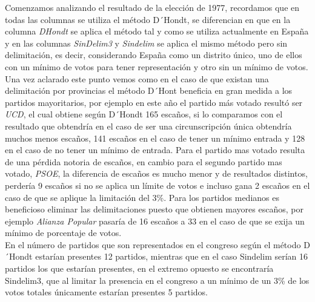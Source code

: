 \documentclass[12pt,a4paper,]{book}
\numberwithin{dummy}{section}
\theoremstyle{ocrenumbox}
\theoremstyle{blacknumex}
\theoremstyle{blacknumbox}
\theoremstyle{ocrenum}
\theoremstyle{ocrenum}
\begin{document}
Comenzamos analizando el resultado de la elección de 1977, recordamos
que en todas las columnas se utiliza el método D´Hondt, se diferencian
en que en la columna \emph{DHondt} se aplica el método tal y como se
utiliza actualmente en España y en las columnas \emph{SinDelim3} y
\emph{Sindelim} se aplica el mismo método pero sin delimitación, es
decir, considerando España como un distrito único, uno de ellos con un
mínimo de votos para tener representación y otro sin un mínimo de
votos.\\
Una vez aclarado este punto vemos como en el caso de que existan una
delimitación por provincias el método D´Hont beneficia en gran medida a
los partidos mayoritarios, por ejemplo en este año el partido más votado
resultó ser \emph{UCD}, el cual obtiene según D´Hondt 165 escaños, si lo
comparamos con el resultado que obtendría en el caso de ser una
circunscripción única obtendría muchos menos escaños, 141 escaños en el
caso de tener un mínimo entrada y 128 en el caso de no tener un mínimo
de entrada. Para el partido mas votado resulta de una pérdida notoria de
escaños, en cambio para el segundo partido mas votado, \emph{PSOE}, la
diferencia de escaños es mucho menor y de resultados distintos, perdería
9 escaños si no se aplica un límite de votos e incluso gana 2 escaños en
el caso de que se aplique la limitación del 3\%. Para los partidos
medianos es beneficioso eliminar las delimitaciones puesto que obtienen
mayores escaños, por ejemplo \emph{Alianza Popular} pasaría de 16
escaños a 33 en el caso de que se exija un mínimo de porcentaje de
votos.\\
En el número de partidos que son representados en el congreso según el
método D´Hondt estarían presentes 12 partidos, mientras que en el caso
Sindelim serían 16 partidos los que estarían presentes, en el extremo
opuesto se encontraría Sindelim3, que al limitar la presencia en el
congreso a un mínimo de un 3\% de los votos totales únicamente estarían
presentes 5 partidos.

\newpage
\end{document}
